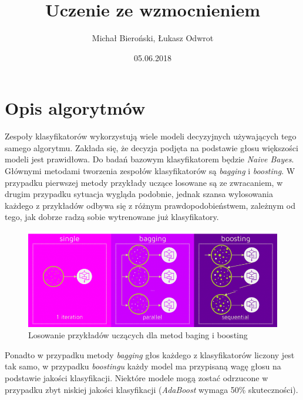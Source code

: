 \documentclass[12pt,a4paper]{article}
\title{Uczenie ze wzmocnieniem}
\date{05.06.2018}
\author{Michał Bieroński, Łukasz Odwrot}
\begin{document}
\maketitle
\thispagestyle{empty}
\newpage
\tableofcontents
\setcounter{page}{1}
\newpage

\section{Opis algorytmów}
Zespoły klasyfikatorów wykorzystują wiele modeli decyzyjnych używających tego samego algorytmu. Zakłada się, że decyzja podjęta na podstawie głosu większości modeli jest prawidłowa. Do badań bazowym klasyfikatorem będzie \textit{Naive Bayes}. Głównymi metodami tworzenia zespołów klasyfikatorów są \textit{bagging} i \textit{boosting}. W przypadku pierwszej metody przykłady uczące losowane są ze zwracaniem, w drugim przypadku sytuacja wygląda podobnie, jednak szansa wylosowania każdego z przykładów odbywa się z różnym prawdopodobieństwem, zależnym od tego, jak dobrze radzą sobie wytrenowane już klasyfikatory.

\begin{figure}[H]
\centering
\includegraphics[scale=0.6]{choseWorks.png}
\caption{Losowanie przykładów uczących dla metod baging i boosting}
\end{figure}

Ponadto w przypadku metody \textit{bagging} głos każdego z klasyfikatorów liczony jest tak samo, w przypadku \textit{boostingu} każdy model ma przypisaną wagę głosu na podstawie jakości klasyfikacji. Niektóre modele mogą zostać odrzucone w przypadku zbyt niskiej jakości klasyfikacji (\textit{AdaBoost} wymaga 50\% skuteczności). 
\end{document}
